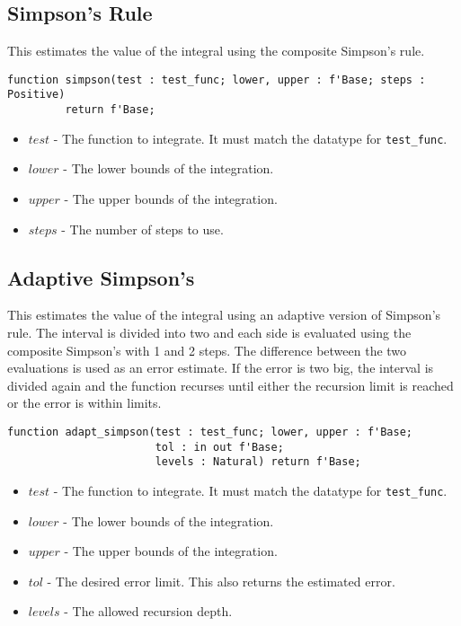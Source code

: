 \documentclass[10pt, openany]{book}
\newcommand{\datatype}[1]{\texttt{#1}}
\begin{document}
\subsection{Simpson's Rule}
This estimates the value of the integral using the composite Simpson's rule.
\begin{lstlisting}
function simpson(test : test_func; lower, upper : f'Base; steps : Positive)
         return f'Base;
\end{lstlisting}
\begin{itemize}
  \item $test$ - The function to integrate.  It must match the datatype for \datatype{test\_func}.
  \item $lower$ - The lower bounds of the integration.
  \item $upper$ - The upper bounds of the integration.
  \item $steps$ - The number of steps to use.
\end{itemize}

\subsection{Adaptive Simpson's}
This estimates the value of the integral using an adaptive version of Simpson's rule.  The interval is divided into two and each side is evaluated using the composite Simpson's with 1 and 2 steps.  The difference between the two evaluations is used as an error estimate.  If the error is two big, the interval is divided again and the function recurses until either the recursion limit is reached or the error is within limits.
\begin{lstlisting}
function adapt_simpson(test : test_func; lower, upper : f'Base;
                       tol : in out f'Base;
                       levels : Natural) return f'Base;
\end{lstlisting}
\begin{itemize}
  \item $test$ - The function to integrate.  It must match the datatype for \datatype{test\_func}.
  \item $lower$ - The lower bounds of the integration.
  \item $upper$ - The upper bounds of the integration.
  \item $tol$ - The desired error limit.  This also returns the estimated error.
  \item $levels$ - The allowed recursion depth.
\end{itemize}
\end{document}
